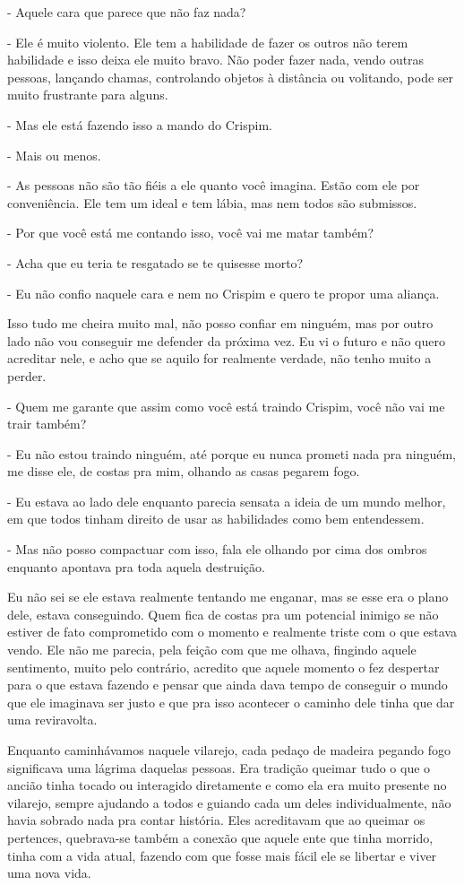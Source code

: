- Aquele cara que parece que não faz nada?

- Ele é muito violento. Ele tem a habilidade de fazer os outros não terem habilidade e isso deixa ele muito bravo. Não poder fazer nada, vendo outras pessoas, lançando chamas, controlando objetos à distância ou volitando, pode ser muito frustrante para alguns.

- Mas ele está fazendo isso a mando do Crispim.

- Mais ou menos.

- As pessoas não são tão fiéis a ele quanto você imagina. Estão com ele por conveniência. Ele tem um ideal e tem lábia, mas nem todos são submissos.

- Por que você está me contando isso, você vai me matar também?

- Acha que eu teria te resgatado se te quisesse morto?

- Eu não confio naquele cara e nem no Crispim e quero te propor uma aliança.

Isso tudo me cheira muito mal, não posso confiar em ninguém, mas por outro lado não vou conseguir me defender da próxima vez. Eu vi o futuro e não quero acreditar nele, e acho que se aquilo for realmente verdade, não tenho muito a perder.

- Quem me garante que assim como você está traindo Crispim, você não vai me trair também?

- Eu não estou traindo ninguém, até porque eu nunca prometi nada pra ninguém, me disse ele, de costas pra mim, olhando as casas pegarem fogo.

- Eu estava ao lado dele enquanto parecia sensata a ideia de um mundo melhor, em que todos tinham direito de usar as habilidades como bem entendessem.

- Mas não posso compactuar com isso, fala ele olhando por cima dos ombros enquanto apontava pra toda aquela destruição.

Eu não sei se ele estava realmente tentando me enganar, mas se esse era o plano dele, estava conseguindo. Quem fica de costas pra um potencial inimigo se não estiver de fato comprometido com o momento e realmente triste com o que estava vendo. Ele não me parecia, pela feição com que me olhava, fingindo aquele sentimento, muito pelo contrário, acredito que aquele momento o fez despertar para o que estava fazendo e pensar que ainda dava tempo de conseguir o mundo que ele imaginava ser justo e que pra isso acontecer o caminho dele tinha que dar uma reviravolta.

Enquanto caminhávamos naquele vilarejo, cada pedaço de madeira pegando fogo significava uma lágrima daquelas pessoas. Era tradição queimar tudo o que o ancião tinha tocado ou interagido diretamente e como ela era muito presente no vilarejo, sempre ajudando a todos e guiando cada um deles individualmente, não havia sobrado nada pra contar história. Eles acreditavam que ao queimar os pertences, quebrava-se também a conexão que aquele ente que tinha morrido, tinha com a vida atual, fazendo com que fosse mais fácil ele se libertar e viver uma nova vida.

